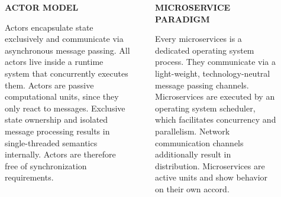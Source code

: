 \documentclass[final,hyperref={pdfpagelabels=true}]{beamer}
\begin{document}
\begin{frame}
  \vspace*{3\baselineskip}

  \begin{columns}[t]
    \begin{column}{.04\textwidth}
    \end{column}
    \begin{column}{.43\textwidth}
      \textsf{\textbf{ACTOR MODEL}} \\
      \vspace*{.5\baselineskip}
      {\lmodern
        \begin{justify}
        Actors encapsulate state exclusively and communicate via asynchronous message passing. All actors live inside a runtime system that concurrently executes them. Actors are passive computational units, since they only react to messages. Exclusive state ownership and isolated message processing results in single-threaded semantics internally. Actors are therefore free of synchronization requirements.
        \end{justify}
      }
    \end{column}
    \begin{column}{.06\textwidth}
    \end{column}
    \begin{column}{.43\textwidth}
      \textsf{\textbf{MICROSERVICE PARADIGM}} \\
      \vspace*{.5\baselineskip}
      {\lmodern
        \begin{justify}
        Every microservices is a dedicated operating system process. They communicate via a light-weight, technology-neutral message passing channels. Microservices are executed by an operating system scheduler, which facilitates concurrency and parallelism. Network communication channels additionally result in distribution. Microservices are active units and show behavior on their own accord.
        \end{justify}
      }
    \end{column}
    \begin{column}{.04\textwidth}
    \end{column}
  \end{columns}

  \vspace*{3\baselineskip}
  

\end{frame}
\end{document}
